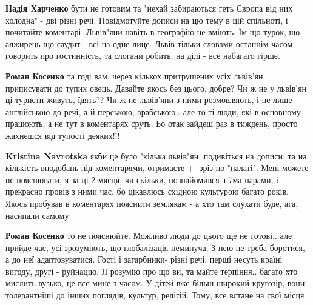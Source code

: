 \begin{itemize}
\begin{itemize}
\begin{itemize}
\textbf{Надія Харченко} бути не готовим та "нехай забираються геть Європа від
них холодна" - дві різні речі. Повідмотуйте дописи на цю тему в цій спільноті,
і почитайте коментарі. Львів"яни навіть в географію не вміють. Їм що турок, що
алжирець що саудит - всі на одне лице. Львів тільки словами останнім часом
говорить про гостинність, та слогани робить, на ділі - все набагато гірше.

 
\textbf{Роман Косенко} та годі вам, через кількох притрушених усіх львів'ян приписувати до тупих овець. Давайте якось без цього, добре? Чи ж не у львів'ян ці туристи живуть, їдять?? Чи ж не львів'яни з ними розмовляють, і не лише англійською до речі, а й перською, арабською.. але то ті люди, які в основному працюють, а не тут в коментарях сруть. Бо отак зайдеш раз в тиждень, просто жахнешся від тупості деяких!!!

 
\textbf{Kristina Navrotska} якби це було "кілька львів"ян, подивіться на
дописи, та на кількість вподобань під коментарями, отримаєте +- зріз по
"палаті". Мені можете не пояснювати, я за ці 2 мясця, чи скільки, познайомився
з 7ма парами, і прекрасно провів з ними час, бо цікавлюсь східною культурою
багато років. Якось пробував в коментарях пояснити землякам - а хто там слухати
буде, ага, насипали самому.

 
\textbf{Роман Косенко} то не пояснюйте. Можливо люди до цього ще не готові..
але прийде час, усі зрозуміють, що глобалізація неминуча. З нею не треба
боротися, а до неї адаптовуватися. Гості і загарбники- різні речі, перші несуть
країні вигоду, другі - руйнацію. Я розумію про що ви, та майте терпіння..
багато хто мислить вузько, це все мине з часом. У дітей вже більш широкий
кругозір, вони толерантніші до інших поглядів, культур, релігій. Тому, все
встане на свої місця


\end{itemize}
\end{itemize}
\end{itemize}
